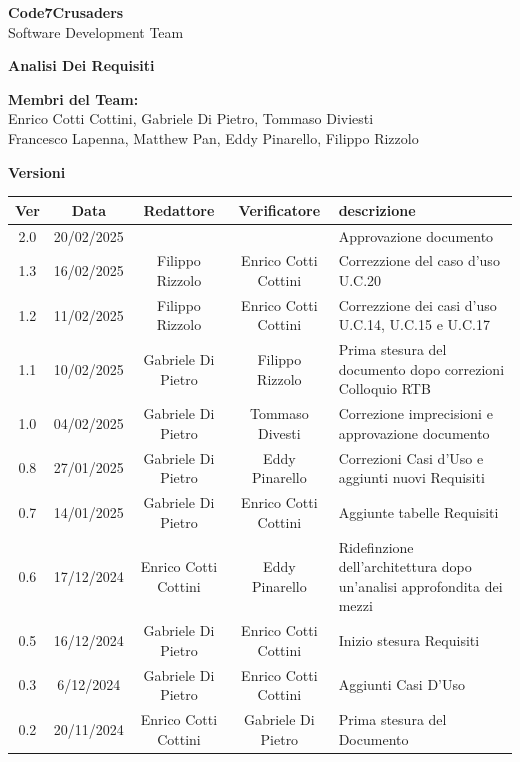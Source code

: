 \documentclass{article}
\begin{document}
\begin{titlepage}
    {\Huge \textbf{Code7Crusaders}}\\
    \vspace{0.5cm}
    {\Large Software Development Team}\\
    \vspace{2cm}
    
    \large \textbf{Analisi Dei Requisiti}
    \vspace{3.9cm}

    \textbf{Membri del Team:}\\
    Enrico Cotti Cottini, Gabriele Di Pietro, Tommaso Diviesti \\
    Francesco Lapenna, Matthew Pan, Eddy Pinarello, Filippo Rizzolo \\
    \vspace{0.5cm}
    
    \vspace{1cm}
\end{titlepage}



\newpage
\begin{center}
    \textbf{Versioni}
    \\
    \vspace{0.3cm}
    \begin{tabular}{|c|c|c|c|>{\centering\arraybackslash}m{}|}
        \hline
        \textbf{Ver} & \textbf{Data} & \textbf{Redattore} & \textbf{Verificatore} & \textbf{descrizione}\\
        \hline
        2.0 & 20/02/2025 &  &  & Approvazione documento \\
        1.3 & 16/02/2025 & Filippo Rizzolo & Enrico Cotti Cottini & Correzzione del caso d'uso U.C.20 \\
        1.2 & 11/02/2025 & Filippo Rizzolo & Enrico Cotti Cottini & Correzzione dei casi d'uso U.C.14, U.C.15 e U.C.17 \\
        1.1 & 10/02/2025 & Gabriele Di Pietro & Filippo Rizzolo & Prima stesura del documento dopo correzioni Colloquio RTB \\
        1.0 & 04/02/2025 & Gabriele Di Pietro & Tommaso Divesti & Correzione imprecisioni e approvazione documento \\
        0.8 & 27/01/2025 & Gabriele Di Pietro & Eddy Pinarello & Correzioni Casi d'Uso e aggiunti nuovi Requisiti \\
        0.7 & 14/01/2025 & Gabriele Di Pietro & Enrico Cotti Cottini & Aggiunte tabelle Requisiti \\
        0.6 & 17/12/2024 & Enrico Cotti Cottini & Eddy Pinarello & Ridefinzione dell'architettura dopo un'analisi approfondita dei mezzi \\
        0.5 & 16/12/2024 & Gabriele Di Pietro & Enrico Cotti Cottini & Inizio stesura Requisiti \\
        0.3 & 6/12/2024 & Gabriele Di Pietro & Enrico Cotti Cottini & Aggiunti Casi D'Uso \\
        0.2 & 20/11/2024 & Enrico Cotti Cottini & Gabriele Di Pietro & Prima stesura del Documento \\
        \hline
    \end{tabular}
\end{center}
\end{document}
